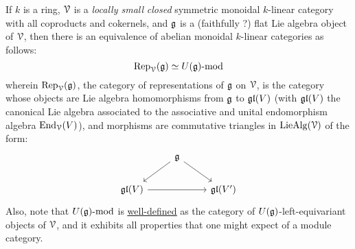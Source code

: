     \begin{theorem}
        If $k$ is a ring, $\mathcal{V}$ is a \textit{locally small} \textit{closed} symmetric monoidal $k$-linear category with all coproducts and cokernels, and $\mathfrak{g}$ is a (faithfully ?) flat Lie algebra object of $\mathcal{V}$, then there is an equivalence of abelian monoidal $k$-linear categories as follows:
            $$\mathrm{Rep}_{\mathcal{V}}(\mathfrak{g}) \simeq {U(\mathfrak{g})}\text{-}\mathrm{mod}$$
        wherein $\mathrm{Rep}_{\mathcal{V}}(\mathfrak{g})$, the category of representations of $\mathfrak{g}$ on $\mathcal{V}$, is the category whose objects are Lie algebra homomorphisms from $\mathfrak{g}$ to $\mathfrak{gl}(V)$ (with $\mathfrak{gl}(V)$ the canonical Lie algebra associated to the associative and unital endomorphism algebra $\mathrm{End}_{\mathcal{V}}(V)$), and morphisms are commutative triangles in $\mathrm{Lie}\mathrm{Alg}(\mathcal{V})$ of the form:
            $$
                \begin{tikzcd}
                	& {\g} \\
                	{\frakgl(V)} && {\frakgl(V')}
                	\arrow[from=2-1, to=2-3]
                	\arrow[from=1-2, to=2-1]
                	\arrow[from=1-2, to=2-3]
                \end{tikzcd}
            $$
        Also, note that ${U(\mathfrak{g})}\text{-}\mathrm{mod}$ is \href{https://ncatlab.org/nlab/show/module+over+a+monoid}{\underline{well-defined}} as the category of $U(\mathfrak{g})$-left-equivariant objects of $\mathcal{V}$, and it exhibits all properties that one might expect of a module category.
    \end{theorem}
